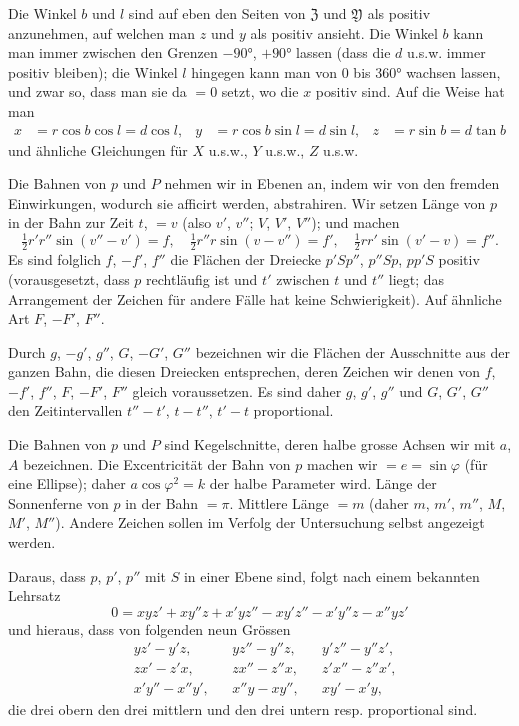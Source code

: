 \documentclass[10pt,a4paper]{article}
\begin{document}
\medskip
\noindent
Die Winkel $b$ und $l$ sind auf eben den Seiten von $\mathfrak{Z}$ und $\mathfrak{Y}$ als positiv anzunehmen, auf welchen man $z$ und $y$ als positiv ansieht. Die Winkel $b$ kann man immer zwischen den Grenzen $-90°$, $+90°$ lassen (dass die $d$ u.s.w. immer positiv bleiben); die Winkel $l$ hingegen kann man von $0$ bis $360°$ wachsen lassen, und zwar so, dass man sie da $= 0$ setzt, wo die $x$ positiv sind. Auf die Weise hat man
\begin{align*}
x &= r\cos b\cos l = d\cos l, & y &= r\cos b\sin l = d\sin l, & z &= r\sin b = d\tan b
\end{align*}
und ähnliche Gleichungen für $X$ u.s.w., $Y$ u.s.w., $Z$ u.s.w.

Die Bahnen von $p$ und $P$ nehmen wir in Ebenen an, indem wir von den fremden Einwirkungen, wodurch sie afficirt werden, abstrahiren. Wir setzen Länge von $p$ in der Bahn zur Zeit $t$, $= v$ (also $v'$, $v''$; $V$, $V'$, $V''$); und machen
\[
\tfrac{1}{2}r'r''\sin(v'' - v') = f, \quad \tfrac{1}{2}r''r\sin(v - v'') = f', \quad \tfrac{1}{2}rr'\sin(v' - v) = f''.
\]
Es sind folglich $f$, $-f'$, $f''$ die Flächen der Dreiecke $p'Sp''$, $p''Sp$, $pp'S$ positiv (vorausgesetzt, dass $p$ rechtläufig ist und $t'$ zwischen $t$ und $t''$ liegt; das Arrangement der Zeichen für andere Fälle hat keine Schwierigkeit). Auf ähnliche Art $F$, $-F'$, $F''$.

Durch $g$, $-g'$, $g''$, $G$, $-G'$, $G''$ bezeichnen wir die Flächen der Ausschnitte aus der ganzen Bahn, die diesen Dreiecken entsprechen, deren Zeichen wir denen von $f$, $-f'$, $f''$, $F$, $-F'$, $F''$ gleich voraussetzen. Es sind daher $g$, $g'$, $g''$ und $G$, $G'$, $G''$ den Zeitintervallen $t'' - t'$, $t - t''$, $t' - t$ proportional.

\clearpage
\noindent
Die Bahnen von $p$ und $P$ sind Kegelschnitte, deren halbe grosse Achsen wir mit $a$, $A$ bezeichnen. Die Excentricität der Bahn von $p$ machen wir $= e = \sin\varphi$ (für eine Ellipse); daher $a\cos\varphi^2 = k$ der halbe Parameter wird. Länge der Sonnenferne von $p$ in der Bahn $= \pi$. Mittlere Länge $= m$ (daher $m$, $m'$, $m''$, $M$, $M'$, $M''$). Andere Zeichen sollen im Verfolg der Untersuchung selbst angezeigt werden.

Daraus, dass $p$, $p'$, $p''$ mit $S$ in einer Ebene sind, folgt nach einem bekannten Lehrsatz
\[
0 = xyz' + xy''z + x'yz'' - xy'z'' - x'y''z - x''yz'
\]
und hieraus, dass von folgenden neun Grössen
\begin{align*}
&yz' - y'z, &&yz'' - y''z, &&y'z'' - y''z', \\
&zx' - z'x, &&zx'' - z''x, &&z'x'' - z''x', \\
&x'y'' - x''y', &&x''y - xy'', &&xy' - x'y,
\end{align*}
die drei obern den drei mittlern und den drei untern resp. proportional sind.
\end{document}

